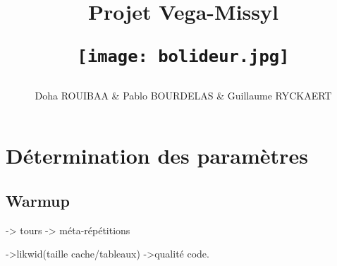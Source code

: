 \documentclass{report}
\begin{document}
\title{%
    \begin{minipage}\linewidth
        \centering
        Projet Vega-Missyl
        \vskip 3pt
        \author{ Doha ROUIBAA & Pablo BOURDELAS & Guillaume RYCKAERT }
    \end{minipage}
    \begin{figure}[ht!]
        \centering
        \texttt{[image: bolideur.jpg]}
    \end{figure}
}
\maketitle

\section*{Détermination des paramètres}

\subsection*{Warmup}

-> tours
-> méta-répétitions

->likwid(taille cache/tableaux)
->qualité code.
\end{document}
